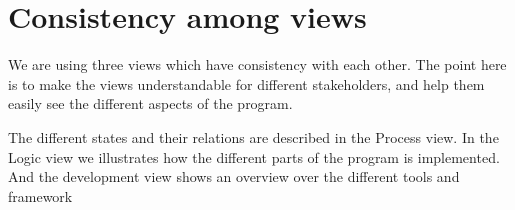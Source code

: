 \section{Consistency among views}

We are using three views which have consistency with each other. The point here is to make the views understandable for different stakeholders, and help them easily see the different aspects of the program.

The different states and their relations are described in the Process view. In the Logic view we illustrates how the different parts of the program is implemented. And the development view shows an overview over the different tools and framework




